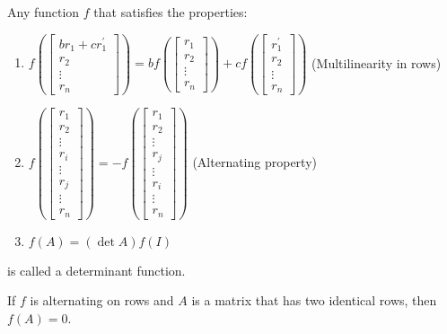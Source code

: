 \documentclass[11pt]{report}
\begin{document}
\begin{definition}
    Any function $f$ that satisfies the properties:
    \begin{enumerate}
        \item $f\left(\begin{bmatrix}
            br_1 + cr_1^\prime \\ r_2 \\ \vdots \\ r_n
        \end{bmatrix}\right) = bf\left(\begin{bmatrix}
            r_1 \\ r_2 \\ \vdots \\ r_n
        \end{bmatrix}\right) + cf\left(\begin{bmatrix}
            r_1^\prime \\ r_2 \\ \vdots \\ r_n
        \end{bmatrix}\right)$ (Multilinearity in rows)
        
        \item $f\left(\begin{bmatrix}
            r_1 \\ r_2 \\ \vdots \\ r_i \\ \vdots \\ r_j \\ \vdots \\ r_n
        \end{bmatrix}\right) = -f\left(\begin{bmatrix}
            r_1 \\ r_2 \\ \vdots \\ r_j \\ \vdots \\ r_i \\ \vdots \\ r_n
        \end{bmatrix}\right)$ (Alternating property)
        
        \item $f(A) = (\det A )f(I)$
    \end{enumerate}
    is called a determinant function.
\end{definition}
\begin{theorem}
    If $f$ is alternating on rows and $A$ is a matrix that has two identical rows, then $f(A) = 0$.
\end{theorem}
\end{document}

